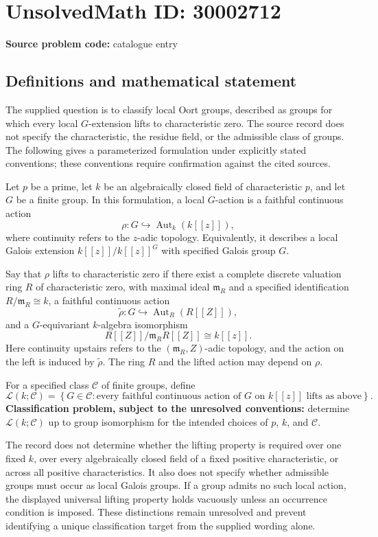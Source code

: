 \documentclass[11pt]{article}
\begin{document}
\section*{UnsolvedMath ID: 30002712}
\textbf{Source problem code:} catalogue entry
\subsection{Definitions and mathematical statement}
The supplied question is to classify local Oort groups, described as groups for which every local \(G\)-extension lifts to characteristic zero. The source record does not specify the characteristic, the residue field, or the admissible class of groups. The following gives a parameterized formulation under explicitly stated conventions; these conventions require confirmation against the cited sources.

Let \(p\) be a prime, let \(k\) be an algebraically closed field of characteristic \(p\), and let \(G\) be a finite group. In this formulation, a local \(G\)-action is a faithful continuous action
\[
\rho\colon G\hookrightarrow \operatorname{Aut}_{k}(k[[z]]),
\]
where continuity refers to the \(z\)-adic topology. Equivalently, it describes a local Galois extension \(k[[z]]/k[[z]]^{G}\) with specified Galois group \(G\).

Say that \(\rho\) lifts to characteristic zero if there exist a complete discrete valuation ring \(R\) of characteristic zero, with maximal ideal \(\mathfrak m_R\) and a specified identification \(R/\mathfrak m_R\cong k\), a faithful continuous action
\[
\widetilde\rho\colon G\hookrightarrow \operatorname{Aut}_{R}(R[[Z]]),
\]
and a \(G\)-equivariant \(k\)-algebra isomorphism
\[
R[[Z]]/\mathfrak m_R R[[Z]]\cong k[[z]].
\]
Here continuity upstairs refers to the \((\mathfrak m_R,Z)\)-adic topology, and the action on the left is induced by \(\widetilde\rho\). The ring \(R\) and the lifted action may depend on \(\rho\).

For a specified class \(\mathcal C\) of finite groups, define
\[
\mathcal L(k;\mathcal C)=
\left\{G\in\mathcal C:\text{every faithful continuous action of }G\text{ on }k[[z]]\text{ lifts as above}\right\}.
\]
\textbf{Classification problem, subject to the unresolved conventions:} determine \(\mathcal L(k;\mathcal C)\) up to group isomorphism for the intended choices of \(p\), \(k\), and \(\mathcal C\).

The record does not determine whether the lifting property is required over one fixed \(k\), over every algebraically closed field of a fixed positive characteristic, or across all positive characteristics. It also does not specify whether admissible groups must occur as local Galois groups. If a group admits no such local action, the displayed universal lifting property holds vacuously unless an occurrence condition is imposed. These distinctions remain unresolved and prevent identifying a unique classification target from the supplied wording alone.
\end{document}
